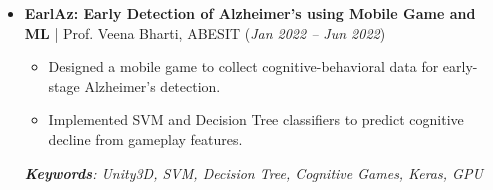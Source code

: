 \documentclass[10pt]{extarticle}
\newcommand{\driveicon}[1]{\href{#1}{\faGoogleDrive}}
\begin{document}
\begin{itemize}[itemsep=4pt]
    \item \textbf{EarlAz: Early Detection of Alzheimer's using Mobile Game and ML} | Prof. Veena Bharti, ABESIT \hfill (\textit{Jan 2022 -- Jun 2022})
    \begin{itemize}[left=10pt]
        \item Designed a mobile game to collect cognitive-behavioral data for early-stage Alzheimer's detection.  
        \item Implemented SVM and Decision Tree classifiers to predict cognitive decline from gameplay features.
    \end{itemize}
    \textit{\textbf{Keywords}: Unity3D, SVM, Decision Tree, Cognitive Games, Keras, GPU}  

\end{itemize}
\vspace{-10pt}
\end{document}
